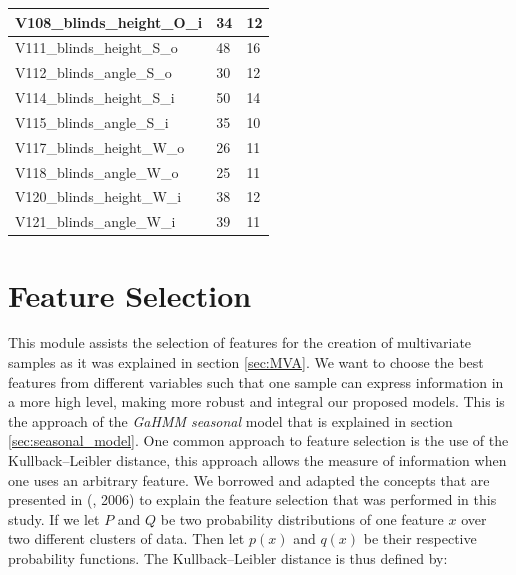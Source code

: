 \begin{table}[]
\begin{tabular}{l|l|l|}
\multicolumn{1}{|l|}{V108\_blinds\_height\_O\_i} & 34                         & 12                \\ \hline
\multicolumn{1}{|l|}{V111\_blinds\_height\_S\_o} & 48                         & 16                \\ \hline
\multicolumn{1}{|l|}{V112\_blinds\_angle\_S\_o}  & 30                         & 12                \\ \hline
\multicolumn{1}{|l|}{V114\_blinds\_height\_S\_i} & 50                         & 14                \\ \hline
\multicolumn{1}{|l|}{V115\_blinds\_angle\_S\_i}  & 35                         & 10                \\ \hline
\multicolumn{1}{|l|}{V117\_blinds\_height\_W\_o} & 26                         & 11                \\ \hline
\multicolumn{1}{|l|}{V118\_blinds\_angle\_W\_o}  & 25                         & 11                \\ \hline
\multicolumn{1}{|l|}{V120\_blinds\_height\_W\_i} & 38                         & 12                \\ \hline
\multicolumn{1}{|l|}{V121\_blinds\_angle\_W\_i}  & 39                         & 11                \\ \hline
\end{tabular}
\end{table}




\section{Feature Selection}
\label{sec:feature_selection}

This module assists the selection of features for the creation of multivariate samples as it was explained in section \ref{sec:MVA}. We want to choose the best features from different variables such that one sample can express information in a more high level, making more robust and integral our proposed models. This is the approach of the \textit{GaHMM seasonal} model that is explained in section \ref{sec:seasonal_model}. One common approach to feature selection is the use of the Kullback–Leibler distance, this approach allows the measure of information when one uses an arbitrary feature. We borrowed and adapted the concepts that are presented in (\citeauthor{eguchi2006interpreting}, 2006) \cite{eguchi2006interpreting} to explain the feature selection that was performed in this study. If we let $P$ and $Q$ be two probability distributions of one feature $x$ over two different clusters of data. Then let $p(x)$ and $q(x)$ be their respective probability functions. The Kullback–Leibler distance is thus defined by:

